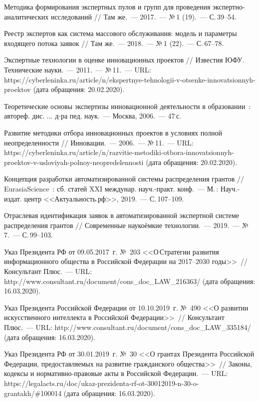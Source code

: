 \begin{thebibliography}{99}
\bibitem{} Методика формирования экспертных пулов и групп для проведения экспертно-аналитических исследований // Там же.~--- 2017.~--- №\,1 (19).~--- С.\,39--54.

\bibitem{} Реестр экспертов как система массового обслуживания: модель и параметры входящего потока заявок // Там же.~--- 2018.~--- №\,1 (22).~--- С.\,67--78.

\bibitem{} Экспертные технологии в оценке инновационных проектов // Известия ЮФУ. Технические науки.~--- 2011.~--- №\,11.~--- URL: https://cyberleninka.ru/article/n/ekspertnye-tehnologii-v-otsenke-innovatsionnyh-proektov (дата обращения: 20.02.2020).

\bibitem{} Теоретические основы экспертизы инновационной деятельности в образовании~: автореф. дис. $\dots$ д-ра пед. наук.~--- Москва, 2006.~--- 47\,с.


\bibitem{} Развитие методики отбора инновационных проектов в условиях полной неопределенности // Инновации.~--- 2006.~--- №\,11.~--- URL: https://cyberleninka.ru/article/n/razvitie-metodiki-otbora-innovatsionnyh-proektov-v-usloviyah-polnoy-neopredelennosti (дата обращения: 20.02.2020).

\bibitem{} Концепция разработки автоматизированной системы распределения грантов // EurasiaScience~: сб. статей XXI междунар. науч.-практ. конф.~--- М.\,: Науч.-издат. центр <<Актуальность.рф>>, 2019.~--- С.\,107--109.

\bibitem{} Отраслевая идентификация заявок в автоматизированной экспертной системе распределения грантов // Современные наукоёмкие технологии.~--- 2019.~--- №\,7.~--- С.\,99--103.

\bibitem{}Указ Президента РФ от 09.05.2017~г. №~203 <<О\,Стратегии развития информационного общества в Российской Федерации на 2017--2030 годы>>~// Консультант Плюс.~--- URL: http://www.consultant.ru/document/cons\_doc\_LAW\_216363/ (дата обращения: 16.03.2020).

\bibitem{}Указ Президента Российской Федерации от 10.10.2019~г. №~490 <<О развитии искусственного интеллекта в Российской Федерации>>~// Консультант Плюс.~--- URL: http://www.consultant.ru/document/cons\_doc\_LAW\_335184/ (дата обращения: 16.03.2020).

\bibitem{}Указ Президента РФ от 30.01.2019~г. №~30 <<О грантах Президента Российской Федерации, предоставляемых на развитие гражданского общества>>~// Законы, кодексы и нормативно-правовые акты в Российской Федерации.~--- URL: https://legalacts.ru/doc/ukaz-prezidenta-rf-ot-30012019-n-30-o-grantakh/\#100014 (дата обращения: 16.03.2020).



\end{thebibliography}
